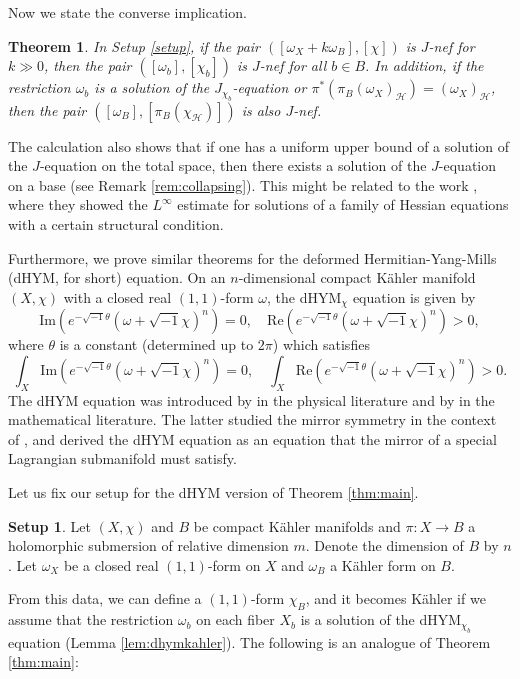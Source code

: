 \documentclass{amsart}
\numberwithin{equation}{section}
\theoremstyle{plain}
\newtheorem{theorem}[equation]{Theorem}
\theoremstyle{definition}
\newtheorem{setup}[equation]{Setup}
\theoremstyle{remark}
\begin{document}
Now we state the converse implication.

\begin{theorem}\label{thm:converse}
In Setup \ref{setup}, if the pair $([\omega_X + k \omega_B], [\chi])$ is $J$-nef for $ k \gg 0$, then the pair $([\omega_b], [\chi_b])$ is $J$-nef for all $ b \in B$. 
In addition, if the restriction $\omega_b$ is a solution of the $J_{\chi_b}$-equation or $\pi^*(\pi_B(\omega_X)_\mathcal{H}) = (\omega_X)_\mathcal{H} $, then the pair $([\omega_B], [\pi_B\left(\chi_\mathcal{H}\right)])$ is also $J$-nef.
\end{theorem}

The calculation also shows that if one has a uniform upper bound of a solution of the $J$-equation on the total space, then there exists a solution of the $J$-equation on a base (see Remark \ref{rem:collapsing}). This might be related to the work \cite{GPT}, where they showed the $L^\infty$ estimate for solutions of a family of Hessian equations with a certain structural condition. 

Furthermore, we prove similar theorems for the deformed Hermitian-Yang-Mills (dHYM, for short) equation.
On an $n$-dimensional compact K{\"a}hler manifold $(X,\chi)$ with a closed real $(1,1)$-form $\omega$, the dHYM$_\chi$ equation is given by
\begin{equation}\label{eq:dhym}
    \mathrm{Im}\left(e^{-\sqrt{-1}\theta}(\omega+\sqrt{-1}\chi)^n\right)=0, \quad \mathrm{Re}\left(e^{-\sqrt{-1}\theta}(\omega+\sqrt{-1}\chi)^n\right)>0,
\end{equation}
where $\theta$ is a constant (determined up to $2\pi$) which satisfies
\begin{equation}\label{eq:dhymconst}
    \int_X \mathrm{Im}\left(e^{-\sqrt{-1}\theta} (\omega+\sqrt{-1}\chi)^n\right)=0, \quad \int_X\mathrm{Re}\left(e^{-\sqrt{-1}\theta}(\omega+\sqrt{-1}\chi)^n\right)>0.
\end{equation}
The dHYM equation was introduced by \cite{MMMS} in the physical literature and by \cite{LYZ} in the mathematical literature. The latter studied the mirror symmetry in the context of \cite{SYZ}, and derived the dHYM equation as an equation that the mirror of a special Lagrangian submanifold must satisfy. 

Let us fix our setup for the dHYM version of Theorem \ref{thm:main}.

\begin{setup}\label{setup:dhym}
    Let $(X,\chi)$ and $B$ be compact K{\"a}hler manifolds and $\pi:X\to B$ a holomorphic submersion of relative dimension $m$. Denote the dimension of $B$ by $n$. Let $\omega_X$ be a closed real $(1,1)$-form on $X$ and $\omega_B$ a K{\"a}hler form on $B$. %
\end{setup}
From this data, we can define a $(1,1)$-form $\chi_B$, and it becomes K{\"a}hler if we assume that the restriction $\omega_b$ on each fiber $X_b$ is a solution of the dHYM$_{\chi_b}$ equation (Lemma \ref{lem:dhymkahler}). The following is an analogue of Theorem \ref{thm:main}:
\end{document}
